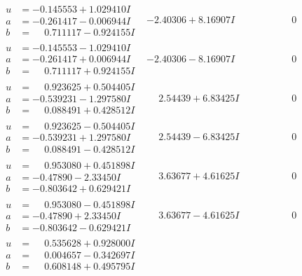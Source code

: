 \documentclass[1p]{elsarticle_modified}
\theoremstyle{definition}
\begin{document}
$$\begin{array}{c|c|c}
\begin{aligned}
u &= -0.145553 + 1.029410 I \\
a &= -0.261417 - 0.006944 I \\
b &= \phantom{-}0.711117 - 0.924155 I\end{aligned}
 & -2.40306 + 8.16907 I & \phantom{-0.000000 } 0 \\ \hline\begin{aligned}
u &= -0.145553 - 1.029410 I \\
a &= -0.261417 + 0.006944 I \\
b &= \phantom{-}0.711117 + 0.924155 I\end{aligned}
 & -2.40306 - 8.16907 I & \phantom{-0.000000 } 0 \\ \hline\begin{aligned}
u &= \phantom{-}0.923625 + 0.504405 I \\
a &= -0.539231 - 1.297580 I \\
b &= \phantom{-}0.088491 + 0.428512 I\end{aligned}
 & \phantom{-}2.54439 + 6.83425 I & \phantom{-0.000000 } 0 \\ \hline\begin{aligned}
u &= \phantom{-}0.923625 - 0.504405 I \\
a &= -0.539231 + 1.297580 I \\
b &= \phantom{-}0.088491 - 0.428512 I\end{aligned}
 & \phantom{-}2.54439 - 6.83425 I & \phantom{-0.000000 } 0 \\ \hline\begin{aligned}
u &= \phantom{-}0.953080 + 0.451898 I \\
a &= -0.47890 - 2.33450 I \\
b &= -0.803642 + 0.629421 I\end{aligned}
 & \phantom{-}3.63677 + 4.61625 I & \phantom{-0.000000 } 0 \\ \hline\begin{aligned}
u &= \phantom{-}0.953080 - 0.451898 I \\
a &= -0.47890 + 2.33450 I \\
b &= -0.803642 - 0.629421 I\end{aligned}
 & \phantom{-}3.63677 - 4.61625 I & \phantom{-0.000000 } 0 \\ \hline\begin{aligned}
u &= \phantom{-}0.535628 + 0.928000 I \\
a &= \phantom{-}0.004657 - 0.342697 I \\
b &= \phantom{-}0.608148 + 0.495795 I\end{aligned}

\end{array}$$
\end{document}
